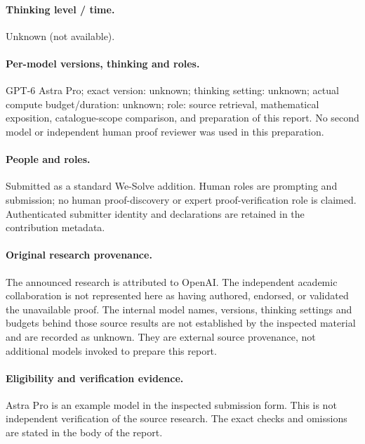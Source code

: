 \documentclass[11pt,a4paper]{article}
\numberwithin{equation}{section}
\theoremstyle{definition}
\theoremstyle{remark}
\begin{document}
\paragraph{Thinking level / time.} Unknown (not available).
\paragraph{Per-model versions, thinking and roles.}
GPT-6 Astra Pro; exact version: unknown; thinking setting: unknown;
actual compute budget/duration: unknown; role: source retrieval, mathematical
exposition, catalogue-scope comparison, and preparation of this report.
No second model or independent human proof reviewer was used in this preparation.
\paragraph{People and roles.}
Submitted as a standard We-Solve addition. Human roles are prompting and submission; no human proof-discovery or expert proof-verification role is claimed. Authenticated submitter identity and declarations are retained in the contribution metadata.
\paragraph{Original research provenance.} The announced research is attributed to OpenAI. The independent academic collaboration is not represented here as having authored, endorsed, or validated the unavailable proof.
The internal model names, versions, thinking settings and budgets behind those
source results are not established by the inspected material and are recorded as
unknown. They are external source provenance, not additional models invoked to
prepare this report.
\paragraph{Eligibility and verification evidence.}
Astra Pro is an example model in the inspected submission form. This is not
independent verification of the source research. The exact checks and omissions
are stated in the body of the report.
\end{document}
